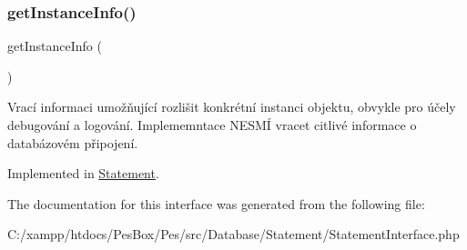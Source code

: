 \subsubsection{\texorpdfstring{get\+Instance\+Info()}{getInstanceInfo()}}
{\footnotesize\ttfamily get\+Instance\+Info (\begin{DoxyParamCaption}{ }\end{DoxyParamCaption})}

Vrací informaci umožňující rozlišit konkrétní instanci objektu, obvykle pro účely debugování a logování. Implememntace N\+E\+S\+MÍ vracet citlivé informace o databázovém připojení. 

Implemented in \mbox{\hyperlink{class_pes_1_1_database_1_1_statement_1_1_statement_ad86fa5498ac1054e414a91fa4a6a7dfd}{Statement}}.



The documentation for this interface was generated from the following file\+:\begin{DoxyCompactItemize}
\item 
C\+:/xampp/htdocs/\+Pes\+Box/\+Pes/src/\+Database/\+Statement/Statement\+Interface.\+php\end{DoxyCompactItemize}
